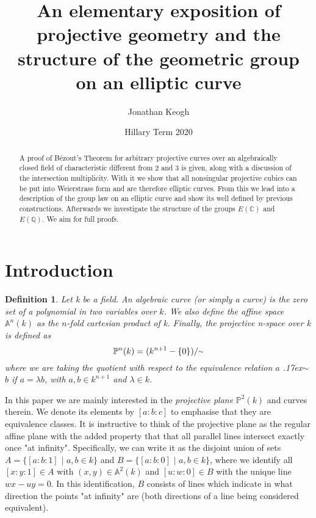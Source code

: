\documentclass{article}
\title{An elementary exposition of projective geometry and the structure of the geometric group on an elliptic curve}
\author{Jonathan Keogh}
\date{Hillary Term 2020}
\newtheorem*{definition}{Definition}
\theoremstyle{remark}
\begin{document}
\renewcommand{\abstractname}{\vspace{-\baselineskip}}
\maketitle
\begin{abstract}
   A proof of Bézout's Theorem for arbitrary projective curves over an algebraically closed field of characteristic different from 2 and 3 is given, along with a discussion of the intersection multiplicity. With it we show that all nonsingular projective cubics can be put into Weierstrass form and are therefore elliptic curves. From this we lead into a description of the group law on an elliptic curve and show its well defined by previous constructions. Afterwards we investigate the structure of the groups $E(\mathbb{C})$ and $E(\mathbb{Q})$. We aim for full proofs.
\end{abstract}
\section{Introduction}
\begin{definition}
Let k be a field. An algebraic curve (or simply a curve) is the zero set of a polynomial in two variables over $k$. We also define the affine space $\mathbb{A}^{n}(k)$ as the $n$-fold cartesian product of \textit{k}. Finally, the \textit{projective n-space over k} is defined as \[ \mathbb{P}^{n}(k) =(k^{n+1} - {\{ 0\} })/  {\raise.17ex\hbox{$\scriptstyle\sim$}} \] where we are taking the quotient with respect to the equivalence relation $a$ {\raise.17ex\hbox{$\scriptstyle\sim$}} $b$ if $a=\lambda b$, with $a,b \in k^{n+1}$ and $\lambda \in k$. 
\end{definition}

In this paper we are mainly interested in the \textit{projective plane} $\mathbb{P}^{2}(k)$ and curves therein. We denote its elements by $[a:b:c]$ to emphasise that they are equivalence classes. It is instructive to think of the projective plane as the regular affine plane with the added property that that all parallel lines intersect exactly once "at infinity". Specifically, we can write it as the disjoint union of sets $A =\{[a:b:1]$ $|$ $ a,b\in k \}$ and $B =\{[a:b:0]$ $|$ $ a,b\in k \}$, where we identify all $[x:y:1]\in A$ with $(x,y)\in \mathbb{A}^{2}(k)$ and $[u:w:0]\in B$ with the unique line $wx-uy=0$. In this identification, $B$ consists of lines which indicate in what direction the points "at infinity" are (both directions of a line being considered equivalent).
\end{document}
